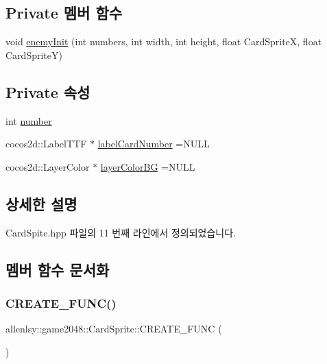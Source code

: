 \subsection*{Private 멤버 함수}
\begin{DoxyCompactItemize}
\item 
void \hyperlink{classallenlsy_1_1game2048_1_1_card_sprite_afdf6cfc4ce73b460a30791de269f7f69}{enemy\+Init} (int numbers, int width, int height, float Card\+SpriteX, float Card\+SpriteY)
\end{DoxyCompactItemize}
\subsection*{Private 속성}
\begin{DoxyCompactItemize}
\item 
int \hyperlink{classallenlsy_1_1game2048_1_1_card_sprite_ad792455a70c4dee8eaf5da553be6f88e}{number}
\item 
cocos2d\+::\+Label\+T\+TF $\ast$ \hyperlink{classallenlsy_1_1game2048_1_1_card_sprite_a9f89b7ca888b5c38fb04776c233cd6aa}{label\+Card\+Number} =N\+U\+LL
\item 
cocos2d\+::\+Layer\+Color $\ast$ \hyperlink{classallenlsy_1_1game2048_1_1_card_sprite_a584c629ff6b2e403fd2393e6edf4e840}{layer\+Color\+BG} =N\+U\+LL
\end{DoxyCompactItemize}


\subsection{상세한 설명}


Card\+Spite.\+hpp 파일의 11 번째 라인에서 정의되었습니다.



\subsection{멤버 함수 문서화}
\mbox{\label{classallenlsy_1_1game2048_1_1_card_sprite_acb47a7c82b77019fab80d7d167495c57}} 
\subsubsection{\texorpdfstring{C\+R\+E\+A\+T\+E\+\_\+\+F\+U\+N\+C()}{CREATE\_FUNC()}}
{\footnotesize\ttfamily allenlsy\+::game2048\+::\+Card\+Sprite\+::\+C\+R\+E\+A\+T\+E\+\_\+\+F\+U\+NC (\begin{DoxyParamCaption}\item[{\hyperlink{classallenlsy_1_1game2048_1_1_card_sprite}{Card\+Sprite}}]{ }\end{DoxyParamCaption})}

